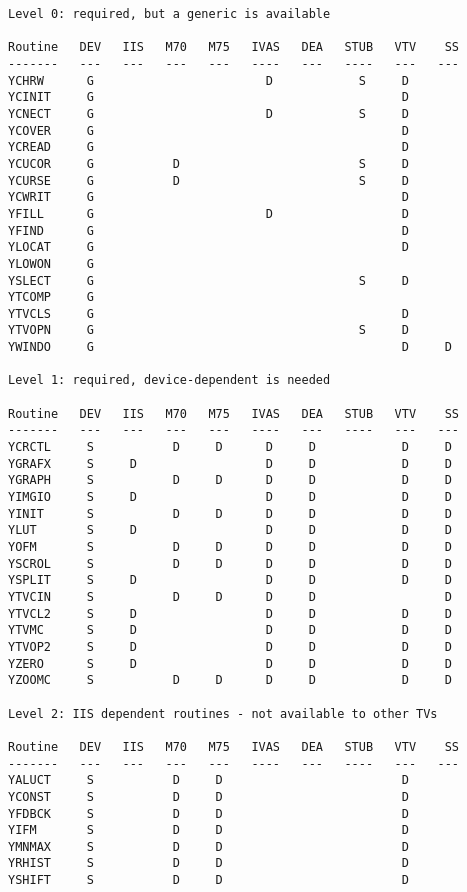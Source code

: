 \begin{verbatim}
Level 0: required, but a generic is available

Routine   DEV   IIS   M70   M75   IVAS   DEA   STUB   VTV    SS
-------   ---   ---   ---   ---   ----   ---   ----   ---   ---
YCHRW      G                        D            S     D
YCINIT     G                                           D
YCNECT     G                        D            S     D
YCOVER     G                                           D
YCREAD     G                                           D
YCUCOR     G           D                         S     D
YCURSE     G           D                         S     D
YCWRIT     G                                           D
YFILL      G                        D                  D
YFIND      G                                           D
YLOCAT     G                                           D
YLOWON     G
YSLECT     G                                     S     D
YTCOMP     G
YTVCLS     G                                           D
YTVOPN     G                                     S     D
YWINDO     G                                           D     D

Level 1: required, device-dependent is needed

Routine   DEV   IIS   M70   M75   IVAS   DEA   STUB   VTV    SS
-------   ---   ---   ---   ---   ----   ---   ----   ---   ---
YCRCTL     S           D     D      D     D            D     D
YGRAFX     S     D                  D     D            D     D
YGRAPH     S           D     D      D     D            D     D
YIMGIO     S     D                  D     D            D     D
YINIT      S           D     D      D     D            D     D
YLUT       S     D                  D     D            D     D
YOFM       S           D     D      D     D            D     D
YSCROL     S           D     D      D     D            D     D
YSPLIT     S     D                  D     D            D     D
YTVCIN     S           D     D      D     D                  D
YTVCL2     S     D                  D     D            D     D
YTVMC      S     D                  D     D            D     D
YTVOP2     S     D                  D     D            D     D
YZERO      S     D                  D     D            D     D
YZOOMC     S           D     D      D     D            D     D

Level 2: IIS dependent routines - not available to other TVs

Routine   DEV   IIS   M70   M75   IVAS   DEA   STUB   VTV    SS
-------   ---   ---   ---   ---   ----   ---   ----   ---   ---
YALUCT     S           D     D                         D
YCONST     S           D     D                         D
YFDBCK     S           D     D                         D
YIFM       S           D     D                         D
YMNMAX     S           D     D                         D
YRHIST     S           D     D                         D
YSHIFT     S           D     D                         D


\end{verbatim}
